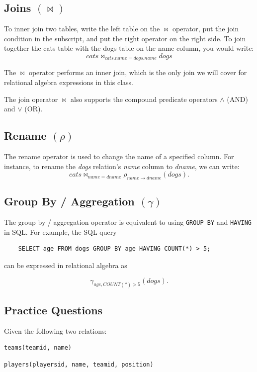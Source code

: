 \documentclass{article}
\begin{document}
\subsection{Joins $(\bowtie)$}
To inner join two tables, write the left table on the $\bowtie$ operator, put the join condition in the subscript, and put the right operator on the right side. To join together the cats table with the dogs table on the name column, you would write:
\[
cats\bowtie_{cats.name = dogs.name} dogs
\]

The $\bowtie$ operator performs an inner join, which is the only join we will cover for relational algebra expressions in this class.

The join operator $\bowtie$ also supports the compound predicate operators $\wedge$ (AND) and $\vee$ (OR).


\subsection{Rename $(\rho)$}
The rename operator is used to change the name of a specified column. For instance, to rename the \textit{dogs} relation’s \textit{name} column to \textit{dname}, we can write:
\[
\textit{cats} \bowtie_{name = dname} \rho_{name \rightarrow dname}(\textit{dogs}).
\]

\subsection{Group By / Aggregation $(\gamma)$
}

The group by / aggregation operator is equivalent to using \texttt{GROUP BY} and \texttt{HAVING} in SQL. For example, the SQL query

\begin{lstlisting}
    SELECT age FROM dogs GROUP BY age HAVING COUNT(*) > 5;
\end{lstlisting}

can be expressed in relational algebra as

\[
    \gamma_{age, COUNT(*)>5}(dogs).
\]

\subsection{Practice Questions}

Given the following two relations:
\begin{lstlisting}
teams(teamid, name)
\end{lstlisting}

\begin{lstlisting}
players(playersid, name, teamid, position)
\end{lstlisting}
\end{document}
